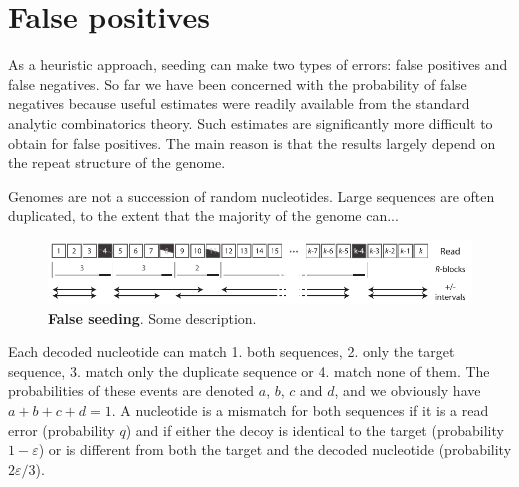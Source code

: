 \documentclass{article}
\begin{document}
\section{False positives}

As a heuristic approach, seeding can make two types of errors: false
positives and false negatives. So far we have been concerned with the
probability of false negatives because useful estimates were readily
available from the standard analytic combinatorics theory. Such estimates
are significantly more difficult to obtain for false positives. The main
reason is that the results largely depend on the repeat structure of the
genome.

Genomes are not a succession of random nucleotides. Large sequences are
often duplicated, to the extent that the majority of the genome can...


\begin{figure}[h]
\centering
\includegraphics[scale=0.88]{sketch_dual_mutations.pdf}
\caption{\textbf{False seeding}. Some description.}
\label{fig:sketchdual}
\end{figure}

Each decoded nucleotide can match 1. both sequences, 2. only the target
sequence, 3. match only the duplicate sequence or 4. match none of them.
The probabilities of these events are denoted $a$, $b$, $c$ and $d$, and
we obviously have $a+b+c+d=1$.
A nucleotide is a mismatch for both sequences if it is a read error
(probability $q$) and if either the decoy is identical to the target
(probability $1-\varepsilon$) or is different from both the target and the
decoded nucleotide (probability $2\varepsilon/3$).
\end{document}
